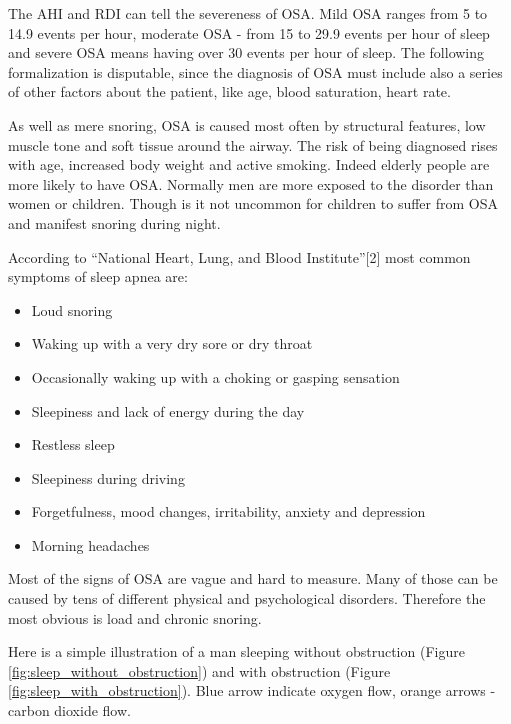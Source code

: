 \documentclass[12pt,a4paper]{report}
\begin{document}
The AHI and RDI can tell the severeness of OSA. Mild OSA ranges from 5 to 14.9 events per hour, moderate OSA - from 15 to 29.9 events per hour of sleep and severe OSA means having over 30 events per hour of sleep. The following formalization is disputable, since the diagnosis of OSA must include also a series of other factors about the patient, like age, blood saturation, heart rate.

As well as mere snoring, OSA is caused most often by structural features, low muscle tone and soft tissue around the airway. The risk of being diagnosed rises with age, increased body weight and active smoking. Indeed elderly people are more likely to have OSA. Normally men are more exposed to the disorder than women or children. Though is it not uncommon for children to suffer from OSA and manifest snoring during night. 

According to “National Heart, Lung, and Blood Institute”[2] most common symptoms of sleep apnea are:
\begin{itemize}
 \item Loud snoring
 \item Waking up with a very dry sore or dry throat
 \item Occasionally waking up with a choking or gasping sensation
 \item Sleepiness and lack of energy during the day
 \item Restless sleep
 \item Sleepiness during driving
 \item Forgetfulness, mood changes, irritability, anxiety and depression
 \item Morning headaches
\end{itemize}

Most of the signs of OSA are vague and hard to measure. Many of those can be caused by tens of different physical and psychological disorders. Therefore the most obvious is load and chronic snoring.

Here is a simple illustration of a man sleeping without obstruction (Figure \ref{fig:sleep_without_obstruction}) and with obstruction (Figure \ref{fig:sleep_with_obstruction}). Blue arrow indicate oxygen flow, orange arrows - carbon dioxide flow.
\end{document}
